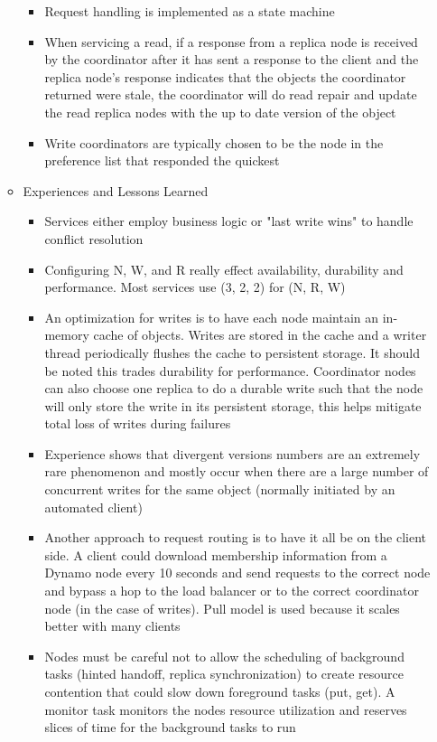\documentclass[a4paper]{article}
\begin{document}
\begin{itemize}
\begin{itemize}
\begin{itemize}
\item Request handling is implemented as a state machine

\item When servicing a read, if a response from a replica node is received by the coordinator after it has sent a response to the client and the replica node's response indicates that the objects the coordinator returned were stale, the coordinator will do read repair and update the read replica nodes with the up to date version of the object

\item Write coordinators are typically chosen to be the node in the preference list that responded the quickest
\end{itemize}

\item Experiences and Lessons Learned
\begin{itemize}
\item Services either employ business logic or "last write wins" to handle conflict resolution

\item Configuring N, W, and R really effect availability, durability and performance. Most services use (3, 2, 2) for (N, R, W)

\item An optimization for writes is to have each node maintain an in-memory cache of objects. Writes are stored in the cache and a writer thread periodically flushes the cache to persistent storage. It should be noted this trades durability for performance. Coordinator nodes can also choose one replica to do a durable write such that the node will only store the write in its persistent storage, this helps mitigate total loss of writes during failures

\item Experience shows that divergent versions numbers are an extremely rare phenomenon and mostly occur when there are a large number of concurrent writes for the same object (normally initiated by an automated client)

\item Another approach to request routing is to have it all be on the client side. A client could download membership information from a Dynamo node every 10 seconds and send requests to the correct node and bypass a hop to the load balancer or to the correct coordinator node (in the case of writes). Pull model is used because it scales better with many clients

\item Nodes must be careful not to allow the scheduling of background tasks (hinted handoff, replica synchronization) to create resource contention that could slow down foreground tasks (put, get). A monitor task monitors the nodes resource utilization and reserves slices of time for the background tasks to run
\end{itemize}

\end{itemize}
\end{itemize}
\end{document}
